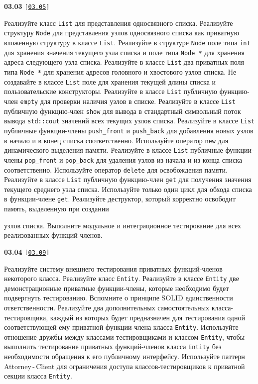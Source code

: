 \documentclass[a4paper,12pt]{article}
\begin{document}
\bigskip

{\large \textbf{03.03} \texttt{[\href{https://github.com/i-s-m-mipt/Education/blob/master/projects/examples/source/03.05.cpp}{\texttt{03.05}}]}}

\bigskip

Реализуйте класс \lstinline{List} для представления односвязного списка. Реализуйте структуру \lstinline{Node} для представления узлов односвязного списка как приватную вложенную структуру в классе \lstinline{List}. Реализуйте в структуре \lstinline{Node} поле типа \lstinline{int} для хранения значения текущего узла списка и поле типа \lstinline{Node *} для хранения адреса следующего узла списка. Реализуйте в классе \lstinline{List} два приватных поля типа \lstinline{Node *} для хранения адресов головного и хвостового узлов списка. Не создавайте в классе \lstinline{List} поле для хранения текущей длины списка и пользовательские конструкторы. Реализуйте в классе \lstinline{List} публичную функцию-член \lstinline{empty} для проверки наличия узлов в списке. Реализуйте в классе \lstinline{List} публичную функцию-член \lstinline{show} для вывода в стандартный символьный поток вывода \lstinline{std::cout} значений всех текущих узлов списка. Реализуйте в классе \lstinline{List} публичные функции-члены \lstinline{push_front} и \lstinline{push_back} для добавления новых узлов в начало и в конец списка соответственно. Используйте оператор \lstinline{new} для динамического выделения памяти. Реализуйте в классе \lstinline{List} публичные функции-члены \lstinline{pop_front} и \lstinline{pop_back} для удаления узлов из начала и из конца списка соответственно. Используйте оператор \lstinline{delete} для освобождения памяти. Реализуйте в классе \lstinline{List} публичную функцию-член \lstinline{get} для получения значения текущего среднего узла списка. Используйте только один цикл для обхода списка в функции-члене \lstinline{get}. Реализуйте деструктор, который корректно освободит память, выделенную при создании 

узлов списка. Выполните модульное и интеграционное тестирование для всех реализованных функций-членов.

\bigskip

{\large \textbf{03.04} \texttt{[\href{https://github.com/i-s-m-mipt/Education/blob/master/projects/examples/source/03.09.cpp}{\texttt{03.09}}]}}

\bigskip

Реализуйте систему внешнего тестирования приватных функций-членов некоторого класса. Реализуйте класс \lstinline{Entity}. Реализуйте в классе \lstinline{Entity} две демонстрационные приватные функции-члены, которые необходимо будет подвергнуть тестированию. Вспомните о принципе SOLID единственности ответственности. Реализуйте два дополнительных самостоятельных класса-тестировщика, каждый из которых будет предназначен для тестирования одной соответствующей ему приватной функции-члена класса \lstinline{Entity}. Используйте отношение дружбы между классами-тестировщиками и классом \lstinline{Entity}, чтобы выполнить тестирование приватных функций-членов класса \lstinline{Entity} без необходимости обращения к его публичному интерфейсу. Используйте паттерн Attorney\,-\,Client для ограничения доступа классов-тестировщиков к приватной секции класса \lstinline{Entity}.
\end{document}
